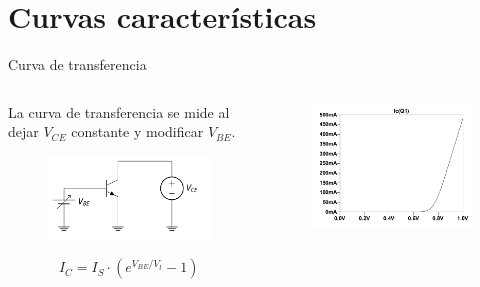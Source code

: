 \documentclass[t,aspectratio=169]{beamer}
\begin{document}
\section{Curvas características}
\begin{frame}{Curva de transferencia}

\begin{columns}
\begin{column}{0.5\textwidth}

La curva de transferencia se mide al dejar $V_{CE}$ constante y modificar $V_{BE}$.

\begin{figure}
    \centering
    \includegraphics[width=\textwidth]{figures/curva_transferencia_1.png}
\end{figure}
%
\[ I_C = I_S \cdot (e^{V_{BE}/V_t} - 1) \]

\end{column}
\begin{column}{0.5\textwidth}

\begin{figure}
    \centering
    \includegraphics[width=\textwidth]{figures/curva_transferencia_2.png}
\end{figure}

\end{column}
\end{columns}

\end{frame}
\end{document}
